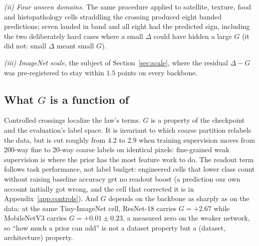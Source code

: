 \emph{(ii) Four unseen domains.} The same procedure applied to satellite,
texture, food and histopathology cells straddling the crossing produced
eight banded predictions; seven landed in band and all eight had the
predicted sign, including the two deliberately hard cases where a small
$\Delta$ could have hidden a large $G$ (it did not: small $\Delta$ meant
small $G$).

\emph{(iii) ImageNet scale}, the subject of Section~\ref{sec:scale},
where the residual $\Delta - G$ was pre-registered to stay within
$1.5$ points on every backbone.

\subsection{What $G$ is a function of}\label{sec:lawG}
Controlled crossings localize the law's terms. $G$ is a property of the
checkpoint and the evaluation's label space. It is invariant to which coarse
partition relabels the data, but is cut roughly from $4.2$ to $2.9$ when
training supervision moves from 200-way fine to 20-way coarse labels on
identical pixels: fine-grained weak supervision is where the prior has the
most feature work to do. The readout term follows task performance,
not label budget: engineered cells that lower class count without raising
baseline accuracy get no readout boost (a prediction our own account
initially got wrong, and the cell that corrected it is in
Appendix~\ref{app:controls}). And $G$ depends on the backbone as sharply
as on the data: at the same Tiny-ImageNet cell, ResNet-18 carries
$G = +2.67$ while MobileNetV3 carries $G = +0.01 \pm 0.23$, a measured
zero on the weaker network, so ``how much a prior can add'' is not a
dataset property but a (dataset, architecture) property.

